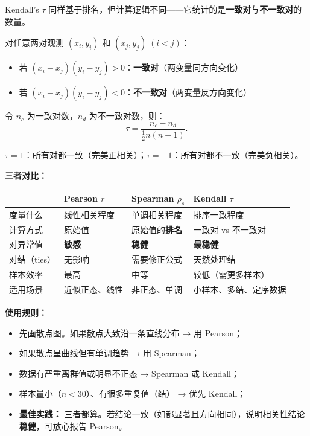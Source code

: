 \begin{definition}
Kendall's $\tau$ 同样基于排名，但计算逻辑不同——它统计的是\textbf{一致对}与\textbf{不一致对}的数量。

对任意两对观测 $(x_i, y_i)$ 和 $(x_j, y_j)\;(i < j)$：
\begin{itemize}
    \item 若 $(x_i - x_j)(y_i - y_j) > 0$：\textbf{一致对}（两变量同方向变化）
    \item 若 $(x_i - x_j)(y_i - y_j) < 0$：\textbf{不一致对}（两变量反方向变化）
\end{itemize}

令 $n_c$ 为一致对数，$n_d$ 为不一致对数，则：
\begin{equation}
    \tau = \frac{n_c - n_d}{\frac{1}{2}n(n-1)}.
\end{equation}

$\tau = 1$：所有对都一致（完美正相关）；$\tau = -1$：所有对都不一致（完美负相关）。
\end{definition}

\medskip
\textbf{三者对比：}

\begin{center}
\renewcommand{\arraystretch}{1.4}
\small
\begin{tabular}{p{2.2cm}|p{3.5cm}|p{3.5cm}|p{3.5cm}}
\toprule
& \textbf{Pearson $r$} & \textbf{Spearman $\rho_s$} & \textbf{Kendall $\tau$} \\
\midrule
度量什么   & 线性相关程度 & 单调相关程度 & 排序一致程度 \\
计算方式   & 原始值 & 原始值的\textbf{排名} & 一致对 vs 不一致对 \\
对异常值   & \textbf{敏感} & \textbf{稳健} & \textbf{最稳健} \\
对结（ties）& 无影响 & 需要修正公式 & 天然处理结 \\
样本效率   & 最高 & 中等 & 较低（需更多样本） \\
适用场景   & 近似正态、线性 & 非正态、单调 & 小样本、多结、定序数据 \\
\midrule
\end{tabular}
\end{center}

\textbf{使用规则：}
\begin{itemize}
    \item 先画散点图。如果散点大致沿一条直线分布 → 用 Pearson；
    \item 如果散点呈曲线但有单调趋势 → 用 Spearman；
    \item 数据有严重离群值或明显不正态 → Spearman 或 Kendall；
    \item 样本量小（$n<30$）、有很多重复值（结） → 优先 Kendall；
    \item \textbf{最佳实践：} 三者都算。若结论一致（如都显著且方向相同），说明相关性结论\textbf{稳健}，可放心报告 Pearson。
\end{itemize}

